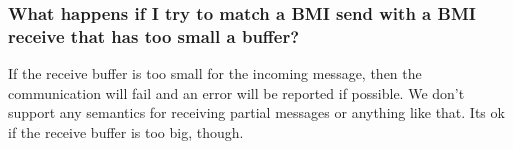\documentclass[11pt,letterpaper]{article}
\begin{document}
\subsubsection{What happens if I try to match a BMI send with a BMI receive
               that has too small a buffer?}

If the receive buffer is too small for the incoming message, then the
communication will fail and an error will be reported if possible.  We
don't support any semantics for receiving partial messages or anything like
that.  Its ok if the receive buffer is too big, though.
    
\end{document}
